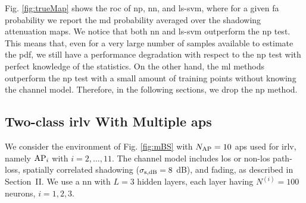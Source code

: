 \documentclass[draftcls,journal,onecolumn]{IEEEtran}
\begin{document}
Fig. \ref{fig:trueMap} shows the \ac{roc}  of \ac{np}, \ac{nn}, and \ac{ls}-\ac{svm}, where for a given \ac{fa} probability we report the  \ac{md} probability averaged over the shadowing attenuation maps. We notice that both \ac{nn} and \ac{ls}-\ac{svm} outperform the \ac{np} test. This means that, even for a very large number of samples available to estimate the \ac{pdf}, we still have a performance degradation with respect to the \ac{np} test with perfect knowledge of the statistics. On the other hand, the \ac{ml} methods outperform the \ac{np} test with a small amount of training points without knowing the channel model. Therefore, in the following sections, we drop the \ac{np} method.
 




\subsection{Two-class \ac{irlv} With Multiple \acp{ap}}
\label{sec:res_fading}

{We consider the environment of Fig. \ref{fig:mBS} with $N_{\rm AP}=10$ \acp{ap} used for \ac{irlv}, namely ${\rm AP}_i$ with $i = 2,\dots,11$. The channel model includes \ac{los} or non-\ac{los} path-loss, spatially correlated shadowing ($\sigma_{\rm s, dB} = 8$ dB), and fading, as described in Section~II. We use a \ac{nn} with $L=3$ hidden layers, each layer having $N^{(i)} = 100$ neurons, $i = 1,2,3$.}  
\end{document}
